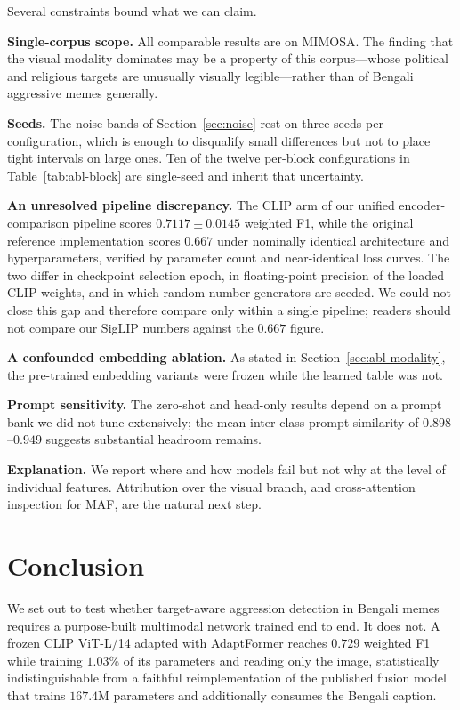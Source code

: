 \documentclass[conference]{IEEEtran}
\begin{document}
Several constraints bound what we can claim.

\textbf{Single-corpus scope.} All comparable results are on MIMOSA. The finding
that the visual modality dominates may be a property of this corpus---whose
political and religious targets are unusually visually legible---rather than of
Bengali aggressive memes generally.

\textbf{Seeds.} The noise bands of Section~\ref{sec:noise} rest on three seeds
per configuration, which is enough to disqualify small differences but not to
place tight intervals on large ones. Ten of the twelve per-block configurations
in Table~\ref{tab:abl-block} are single-seed and inherit that uncertainty.

\textbf{An unresolved pipeline discrepancy.} The CLIP arm of our unified
encoder-comparison pipeline scores $0.7117 \pm 0.0145$ weighted F1, while the
original reference implementation scores $0.667$ under nominally identical
architecture and hyperparameters, verified by parameter count and near-identical
loss curves. The two differ in checkpoint selection epoch, in floating-point
precision of the loaded CLIP weights, and in which random number generators are
seeded. We could not close this gap and therefore compare only within a single
pipeline; readers should not compare our SigLIP numbers against the $0.667$
figure.

\textbf{A confounded embedding ablation.} As stated in
Section~\ref{sec:abl-modality}, the pre-trained embedding variants were frozen
while the learned table was not.

\textbf{Prompt sensitivity.} The zero-shot and head-only results depend on a
prompt bank we did not tune extensively; the mean inter-class prompt similarity
of $0.898$--$0.949$ suggests substantial headroom remains.

\textbf{Explanation.} We report where and how models fail but not why at the
level of individual features. Attribution over the visual branch, and
cross-attention inspection for MAF, are the natural next step.

\section{Conclusion}
\label{sec:conclusion}

We set out to test whether target-aware aggression detection in Bengali memes
requires a purpose-built multimodal network trained end to end. It does not. A
frozen CLIP ViT-L/14 adapted with AdaptFormer reaches $0.729$ weighted F1 while
training $1.03\%$ of its parameters and reading only the image, statistically
indistinguishable from a faithful reimplementation of the published fusion model
that trains $167.4$M parameters and additionally consumes the Bengali caption.
\end{document}
